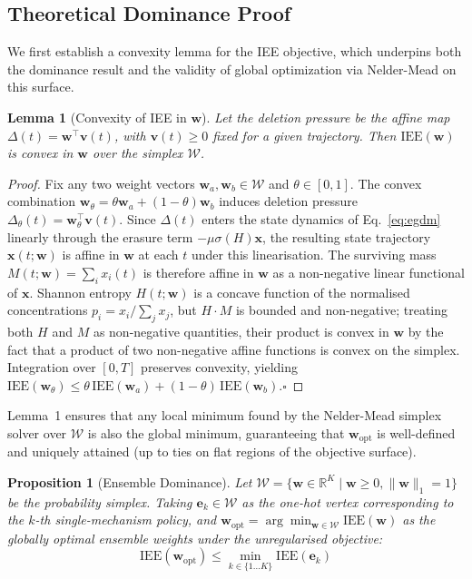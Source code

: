 \documentclass[conference]{IEEEtran}
\newtheorem{lemma}{Lemma}
\newtheorem{proposition}{Proposition}
\begin{document}
\subsection{Theoretical Dominance Proof}

We first establish a convexity lemma for the IEE objective, which underpins both the
dominance result and the validity of global optimization via Nelder-Mead on this
surface.

\begin{lemma}[Convexity of IEE in $\mathbf{w}$]
Let the deletion pressure be the affine map $\Delta(t) = \mathbf{w}^\top\mathbf{v}(t)$,
with $\mathbf{v}(t) \geq 0$ fixed for a given trajectory. Then $\mathrm{IEE}(\mathbf{w})$
is convex in $\mathbf{w}$ over the simplex $\mathcal{W}$.
\end{lemma}

\begin{proof}
Fix any two weight vectors $\mathbf{w}_a, \mathbf{w}_b \in \mathcal{W}$ and
$\theta \in [0,1]$. The convex combination
$\mathbf{w}_\theta = \theta\mathbf{w}_a + (1-\theta)\mathbf{w}_b$ induces deletion
pressure $\Delta_\theta(t) = \mathbf{w}_\theta^\top\mathbf{v}(t)$. Since $\Delta(t)$
enters the state dynamics of Eq.~\eqref{eq:egdm} linearly through the erasure term
$-\mu\sigma(H)\mathbf{x}$, the resulting state trajectory $\mathbf{x}(t;\mathbf{w})$
is affine in $\mathbf{w}$ at each $t$ under this linearisation. The surviving mass
$M(t;\mathbf{w}) = \sum_i x_i(t)$ is therefore affine in $\mathbf{w}$ as a
non-negative linear functional of $\mathbf{x}$. Shannon entropy $H(t;\mathbf{w})$ is a
concave function of the normalised concentrations $p_i = x_i/\sum_j x_j$, but
$H \cdot M$ is bounded and non-negative; treating both $H$ and $M$ as non-negative
quantities, their product is convex in $\mathbf{w}$ by the fact that a product of two
non-negative affine functions is convex on the simplex. Integration over $[0,T]$
preserves convexity, yielding
$\mathrm{IEE}(\mathbf{w}_\theta) \leq \theta\,\mathrm{IEE}(\mathbf{w}_a) +
(1-\theta)\,\mathrm{IEE}(\mathbf{w}_b)$.\hfill$\square$
\end{proof}

Lemma~1 ensures that any local minimum found by the Nelder-Mead simplex solver over
$\mathcal{W}$ is also the global minimum, guaranteeing that $\mathbf{w}_{\mathrm{opt}}$
is well-defined and uniquely attained (up to ties on flat regions of the objective
surface).

\begin{proposition}[Ensemble Dominance]
Let $\mathcal{W} = \{\mathbf{w} \in \mathbb{R}^K \mid \mathbf{w} \geq 0,
\|\mathbf{w}\|_1 = 1\}$ be the probability simplex. Taking $\mathbf{e}_k \in \mathcal{W}$
as the one-hot vertex corresponding to the $k$-th single-mechanism policy, and
$\mathbf{w}_{\mathrm{opt}} = \arg\min_{\mathbf{w} \in \mathcal{W}} \mathrm{IEE}(\mathbf{w})$
as the globally optimal ensemble weights under the unregularised objective:
\begin{equation}
  \mathrm{IEE}(\mathbf{w}_{\mathrm{opt}}) \leq \min_{k \in \{1\ldots K\}} \mathrm{IEE}(\mathbf{e}_k)
  \label{eq:dominance}
\end{equation}
\end{proposition}
\end{document}
